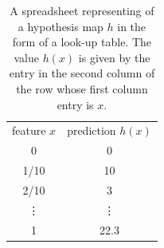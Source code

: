 \documentclass[12pt]{report}
\begin{document}
\vspace*{2mm}
\begin{table}
\begin{center}
\begin{tabular}{ |c|c| }
  \multicolumn{1}{c}{feature $x$}
  &  \multicolumn{1}{c}{prediction $h(x)$} \\
\cline{1-2}
 0 & 0 \\
 \cline{1-2}
 1/10 & 10 \\
 \cline{1-2}
 2/10 & 3 \\
 \cline{1-2}
 \vdots & \vdots \\
 \cline{1-2}
 1 & 22.3 \\
\cline{1-2}
\end{tabular}
\end{center}
\caption{A spreadsheet representing of a hypothesis map $h$ in the form of 
	a look-up table. The value $h(x)$ is given by the entry in the second column 
	of the row whose first column entry is $x$.}
\label{table_lookup}
\end{table}
\vspace*{2mm}

\end{document}
